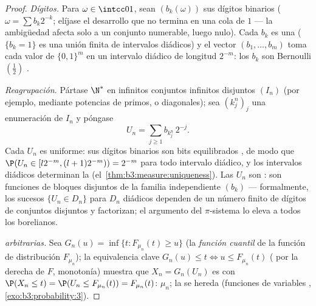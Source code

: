 \begin{proof}
\emph{Dígitos.} Para $\omega \in \intcc01$, sean $(b_k(\omega))$ sus
dígitos binarios ($\omega = \sum b_k2^{-k}$; elíjase el desarrollo que
no termina en una cola de $1$ --- la ambigüedad afecta solo a un
conjunto numerable, luego nulo). Cada $b_k$ es una
 ($\{b_k = 1\}$ es
una unión finita de intervalos diádicos) y el vector $(b_1, \dots, b_m)$
toma cada valor de $\{0,1\}^m$ en un intervalo diádico de longitud
$2^{-m}$: los $b_k$ son Bernoulli$(\frac12)$
.

\emph{Reagrupación.} Pártase $\N^*$ en infinitos conjuntos infinitos
disjuntos $(I_n)$ (por ejemplo, mediante potencias de primos, o
diagonales); sea $(k^n_j)_j$ una enumeración de $I_n$ y póngase
\[
U_n = \sum_{j\geq1} b_{k^n_j}\,2^{-j} .
\]
Cada $U_n$ es uniforme: sus dígitos binarios son bits equilibrados
, de modo que
$\P(U_n \in [l2^{-m}, (l+1)2^{-m})) = 2^{-m}$ para todo intervalo
diádico, y los intervalos diádicos determinan la
(el~\cref{thm:b3:measure:uniqueness}). Las $U_n$ son
: son funciones
de bloques disjuntos de la familia
independiente $(b_k)$ ---
formalmente, los sucesos $\{U_n \in D_n\}$ para $D_n$ diádicos dependen
de un número finito de dígitos de conjuntos disjuntos y factorizan; el
argumento del $\pi$-sistema lo eleva a todos los borelianos.

\emph{ arbitrarias.} Sea
$G_n(u) = \inf\{t : F_{\mu_n}(t)
\geq u\}$ (la \emph{función cuantil} de la función de distribución
$F_{\mu_n}$); la equivalencia clave $G_n(u) \leq t
\iff u \leq F_{\mu_n}(t)$
( por la derecha de $F$,
monotonía) muestra que $X_n = G_n(U_n)$ es
 con
$\P(X_n \leq t) = \P(U_n \leq F_{\mu_n}(t)) =
F_{\mu_n}(t)$:  $\mu_n$; la
 se hereda
(funciones de variables
,
\cref{exo:b3:probability:3}).
\end{proof}

